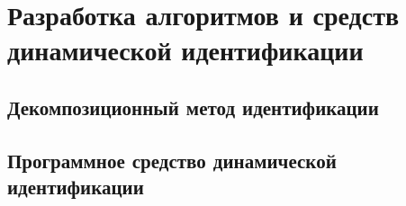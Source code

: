 \chapter{Разработка алгоритмов и средств динамической идентификации}

\section{Декомпозиционный метод идентификации}

\section{Программное средство динамической идентификации}

\subsection{}

